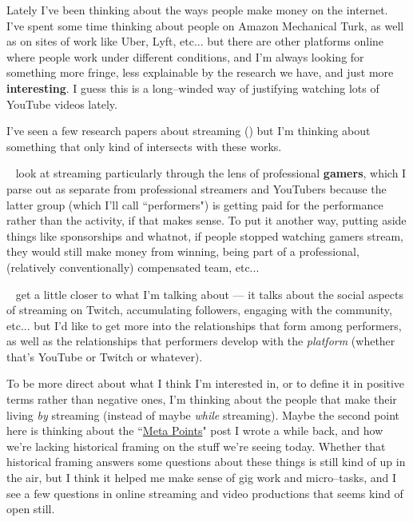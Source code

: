 \documentclass[11pt]{article}
\begin{document}
Lately I've been thinking about the ways people make money on the internet.
I've spent some time thinking about people on Amazon Mechanical Turk, as well as 
on sites of work like Uber, Lyft, etc...
but there are other platforms online where people work under different conditions,
and I'm always looking for something more fringe,
less explainable by the research we have,
and just more \textbf{interesting}.
I guess this is a long--winded way of justifying
watching lots of YouTube videos lately.

I've seen a few research papers about streaming
(\cite[see][]
{Kaytoue:2012:WMP:2187980.2188259,Hamilton:2014:STF:2611105.2557048,Zhang:2015:CIL:2736084.2736091})
but I'm thinking about something that only kind of intersects with these works.

\citeauthor{Kaytoue:2012:WMP:2187980.2188259}~\cite{Kaytoue:2012:WMP:2187980.2188259}
look at streaming particularly through the lens of
professional \textbf{gamers}, which I parse out as separate from professional streamers
and YouTubers because the latter group
(which I'll call ``performers")
is getting paid for the performance rather than the activity,
if that makes sense.
To put it another way, putting aside things like sponsorships and whatnot,
if people stopped watching gamers stream,
they would still make money from winning,
being part of a professional,
(relatively conventionally) compensated team, etc...

\citeauthor{Hamilton:2014:STF:2611105.2557048}~\cite{Hamilton:2014:STF:2611105.2557048}
get a little closer to what I'm talking about
--- it talks about the social aspects of streaming on Twitch,
accumulating followers, engaging with the community, etc...
but I'd like to get more into
the relationships that form among performers, as well as
the relationships that performers develop with the \textit{platform}
(whether that's YouTube or Twitch or whatever).

To be more direct about what I think I'm interested in,
or to define it in positive terms rather than negative ones,
I'm thinking about the people that make their living \textit{by} streaming
(instead of maybe \textit{while} streaming).
Maybe the second point here is thinking about
the ``\href{https://ali-alkhatib.com/blog/meta-points}{Meta Points}" post I wrote a while back,
and how we're lacking historical framing on the stuff we're seeing today.
Whether that historical framing answers some questions about these things
is still kind of up in the air, but
I think it helped me make sense of gig work and micro--tasks,
and I see a few questions in
online streaming and video productions
that seems kind of open still.
\end{document}
